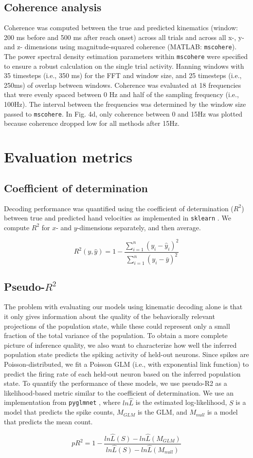 \documentclass{article}
\begin{document}
\subsection{Coherence analysis}

Coherence was computed between the true and predicted kinematics (window: 200 ms before and 500 ms after reach onset) across all trials and across all x-, y- and z- dimensions using magnitude-squared coherence (MATLAB: \texttt{mscohere}). The power spectral density estimation parameters within \texttt{mscohere} were specified to ensure a robust calculation on the single trial activity. Hanning windows with 35 timesteps (i.e., 350 ms) for the FFT and window size, and 25 timesteps (i.e., 250ms) of overlap between windows. Coherence was evaluated at 18 frequencies that were evenly spaced between 0 Hz and half of the sampling frequency (i.e., 100Hz). The interval between the frequencies was determined by the window size passed to \texttt{mscohere}. In Fig. 4d, only coherence between 0 and 15Hz was plotted because coherence dropped low for all methods after 15Hz.


\section{Evaluation metrics}

\subsection{Coefficient of determination}

Decoding performance was quantified using the coefficient of determination ($R^2$) between true and predicted hand velocities as implemented in \texttt{sklearn} \cite{pedregosa2011scikit}. We compute $R^2$ for $x$- and $y$-dimensions separately, and then average.

$$R^2(y, \hat{y}) = 1 - \frac{\sum_{i=1}^{n} (y_i - \hat{y}_i)^2}{\sum_{i=1}^{n} (y_i - \bar{y})^2}$$

\subsection{Pseudo-$R^2$}

The problem with evaluating our models using kinematic decoding alone is that it only gives information about the quality of the behaviorally relevant projections of the population state, while these could represent only a small fraction of the total variance of the population. To obtain a more complete picture of inference quality, we also want to characterize how well the inferred population state predicts the spiking activity of held-out neurons. Since spikes are Poisson-distributed, we fit a Poisson GLM (i.e., with exponential link function) to predict the firing rate of each held-out neuron based on the inferred population state. To quantify the performance of these models, we use pseudo-R2 as a likelihood-based metric similar to the coefficient of determination. We use an implementation from \texttt{pyglmnet} \cite{Jas2020}, where $ln\hat{L}$ is the estimated log-likelihood, $S$ is a model that predicts the spike counts, $M_{GLM}$ is the GLM, and $M_{null}$ is a model that predicts the mean count.

$$pR^2 = 1 - \frac{ln \hat{L}(S) - ln \hat{L}(M_{GLM})}{ln \hat{L}(S) - ln \hat{L}(M_{null})}$$


\newpage


\end{document}
